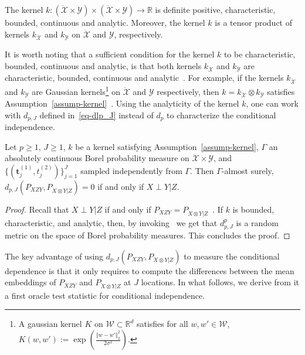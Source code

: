 \begin{assump}
\label{assump-kernel}
 The kernel $k : (\mathcal{\ddot{X}}\times \mathcal{Y})\times (\mathcal{\ddot{X}}\times \mathcal{Y}) \rightarrow \mathbb{R}$ is definite positive, characteristic, bounded, continuous and analytic. Moreover, the kernel $k$ is a tensor product of kernels $k_{\ddot{\mathcal{X}}}$ and $k_\mathcal{Y}$ on $\mathcal{\ddot{X}}$ and $\mathcal{Y}$, respectively.
\end{assump}
It is worth noting that a sufficient condition for the kernel $k$ to be characteristic, bounded, continuous and analytic, is that both kernels $k_{\mathcal{\ddot{X}}}$ and $k_{\mathcal{Y}}$ are characteristic, bounded, continuous and analytic~\citep{szabo2018characteristic}. For example, if the kernels $k_\mathcal{\ddot{X}}$ and $k_\mathcal{Y}$ are Gaussian kernels\footnote{A gaussian kernel $K$ on $\mathcal{W}\subset\mathbb{R}^d$ satisfies for all $w,w'\in\mathcal{W}$, $K(w,w'):=\exp\left(\frac{\Vert w - w'\Vert_2^2}{2\sigma^2}\right).$} on $\mathcal{\ddot{X}}$ and $\mathcal{Y}$ respectively, then $k=k_\mathcal{\ddot{X}}\otimes k_\mathcal{Y}$ satisfies Assumption~\ref{assump-kernel}~\citep{jitkrittum2017adaptive}. Using the analyticity of the kernel $k$, one can work with $d_{p,J}$ defined in~\eqref{eq-dlp_J} instead of $d_{p}$ to characterize the conditional independence.
\begin{prop}
Let $p\geq 1$, $J\geq 1$, $k$ be a kernel satisfying Assumption~\ref{assump-kernel}, $\Gamma$ an absolutely continuous Borel probability measure on $\mathcal{\ddot{X}}\times\mathcal{Y}$, and $\{(\mathbf{t}^{(1)}_j,t^{(2)}_j)\}_{j=1}^J$ sampled independently from $\Gamma$. Then $\Gamma$-almost surely, $d_{p,J}(P_{XZY},P_{\ddot{X}\otimes Y|Z})=0$ if and only if $X\perp Y | Z$.
\end{prop}
\begin{proof}
Recall that $X\perp Y | Z$ if and only if $P_{XZY}=P_{\ddot{X}\otimes Y|Z}$~\citep{fukumizu2008kernel}. If $k$ is bounded, characteristic, and analytic, then, by invoking~\citep[Theorem 4]{NEURIPS2019_0e2db0cb} we get that $d_{p,J}^p$ is a random metric on the space of Borel probability measures. This concludes the proof.
\end{proof}
The key advantage of using $d_{p,J}(P_{XZY},P_{\ddot{X}\otimes Y|Z})$ to measure the conditional dependence is that it only requires to compute the differences between the mean embeddings of $P_{XZY}$ and $P_{\ddot{X}\otimes Y|Z}$ at $J$ locations. In what follows, we derive from it a first oracle test statistic for conditional independence.



